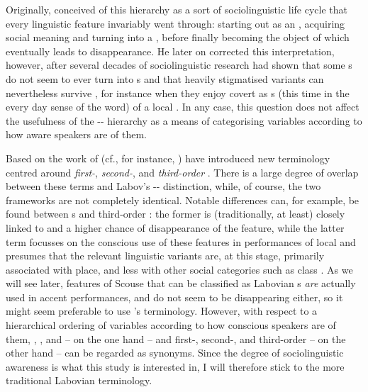 Originally, \citeauthor{labov1972} conceived of this hierarchy as a sort of sociolinguistic life cycle that every linguistic feature invariably went through: starting out as an , acquiring social meaning and turning into a , before finally becoming the object of  which eventually leads to disappearance.
He later on corrected this interpretation, however, after several decades of sociolinguistic research had shown that some s do not seem to ever turn into s and that heavily stigmatised variants can nevertheless survive \parencite{labov1994}, for instance when they enjoy covert  as s (this time in the every day sense of the word) of a local .
In any case, this question does not affect the usefulness of the -- hierarchy as a means of categorising variables according to how aware speakers are of them.

Based on the work of \citeauthor{silverstein2003} (cf., for instance, \citealt{silverstein2003}) \textcite[cf.][78]{johnstoneetal2006} have introduced new terminology centred around \emph{first-}, \emph{second-}, and \emph{third-order }.
There is a large degree of overlap between these terms and Labov's -- distinction, while, of course, the two frameworks are not completely identical.
Notable differences can, for example, be found between s and third-order : the former is (traditionally, at least) closely linked to  and a higher chance of disappearance of the feature, while the latter term focusses on the conscious use of these features in performances of local  and presumes that the relevant linguistic variants are, at this stage, primarily associated with place, and less with other social categories such as class \parencite[cf.][81--84]{johnstoneetal2006}.
As we will see later, features of Scouse that can be classified as Labovian s \emph{are} actually used in accent performances, and do not seem to be disappearing either, so it might seem preferable to use \citeauthor{johnstoneetal2006}'s terminology.
However, with respect to a hierarchical ordering of variables according to how conscious speakers are of them, , , and  -- on the one hand -- and first-, second-, and third-order  -- on the other hand -- can be regarded as synonyms.
Since the degree of sociolinguistic awareness is what this study is interested in, I will therefore stick to the more traditional Labovian terminology.


